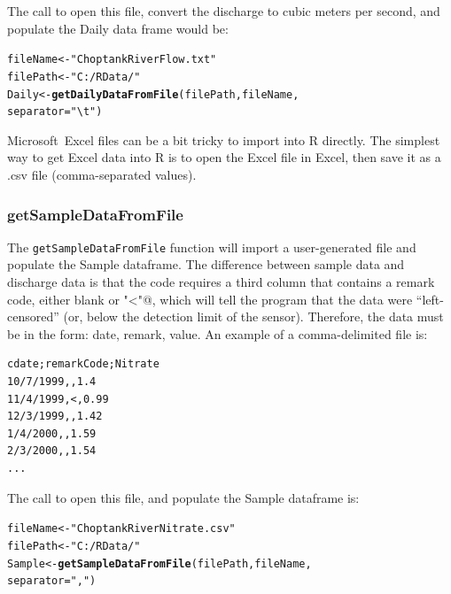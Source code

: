 \documentclass[a4paper,11pt]{article}\usepackage[]{graphicx}\usepackage[]{color}
\makeatletter
\newcommand{\hlstr}[1]{\textcolor[rgb]{0.192,0.494,0.8}{#1}}%
\newcommand{\hlstd}[1]{\textcolor[rgb]{0.345,0.345,0.345}{#1}}%
\newcommand{\hlkwb}[1]{\textcolor[rgb]{0.69,0.353,0.396}{#1}}%
\newcommand{\hlkwc}[1]{\textcolor[rgb]{0.333,0.667,0.333}{#1}}%
\newcommand{\hlkwd}[1]{\textcolor[rgb]{0.737,0.353,0.396}{\textbf{#1}}}%
\newenvironment{kframe}{%
 \def\at@end@of@kframe{}%
 \ifinner\ifhmode%
  \def\at@end@of@kframe{\end{minipage}}%
  \begin{minipage}{\columnwidth}%
 \fi\fi%
 \def\FrameCommand##1{\hskip\@totalleftmargin \hskip-\fboxsep
 \colorbox{shadecolor}{##1}\hskip-\fboxsep
     \hskip-\linewidth \hskip-\@totalleftmargin \hskip\columnwidth}%
 \MakeFramed {\advance\hsize-\width
   \@totalleftmargin\z@ \linewidth\hsize
   \@setminipage}}%
 {\par\unskip\endMakeFramed%
 \at@end@of@kframe}
\newenvironment{knitrout}{}{} %
\makeatother
\begin{document}
The call to open this file, convert the discharge to cubic meters per second, and populate the Daily data frame would be:
\begin{knitrout}
\color{fgcolor}\begin{kframe}
\begin{alltt}
\hlstd{fileName} \hlkwb{<-} \hlstr{"ChoptankRiverFlow.txt"}
\hlstd{filePath} \hlkwb{<-}  \hlstr{"C:/RData/"}
\hlstd{Daily} \hlkwb{<-} \hlkwd{getDailyDataFromFile}\hlstd{(filePath,fileName,}
                    \hlkwc{separator}\hlstd{=}\hlstr{"\textbackslash{}t"}\hlstd{)}
\end{alltt}
\end{kframe}
\end{knitrout}

Microsoft\textregistered\ Excel files can be a bit tricky to import into R directly. The simplest way to get Excel data into R is to open the Excel file in Excel, then save it as a .csv file (comma-separated values). 

\FloatBarrier

\subsubsection{getSampleDataFromFile}
\label{sec:SampleFile}

\doublespacing
The \texttt{getSampleDataFromFile} function will import a user-generated file and populate the Sample dataframe. The difference between sample data and discharge data is that the code requires a third column that contains a remark code, either blank or \verb@"<"@, which will tell the program that the data were \enquote{left-censored} (or, below the detection limit of the sensor). Therefore, the data must be in the form: date, remark, value.   An example of a comma-delimited file is:

\singlespacing
\begin{verbatim}
cdate;remarkCode;Nitrate
10/7/1999,,1.4
11/4/1999,<,0.99
12/3/1999,,1.42
1/4/2000,,1.59
2/3/2000,,1.54
...
\end{verbatim}
\doublespacing

The call to open this file, and populate the Sample dataframe is:
\begin{knitrout}
\color{fgcolor}\begin{kframe}
\begin{alltt}
\hlstd{fileName} \hlkwb{<-} \hlstr{"ChoptankRiverNitrate.csv"}
\hlstd{filePath} \hlkwb{<-}  \hlstr{"C:/RData/"}
\hlstd{Sample} \hlkwb{<-} \hlkwd{getSampleDataFromFile}\hlstd{(filePath,fileName,}
                                \hlkwc{separator}\hlstd{=}\hlstr{","}\hlstd{)}
\end{alltt}
\end{kframe}
\end{knitrout}
\end{document}
